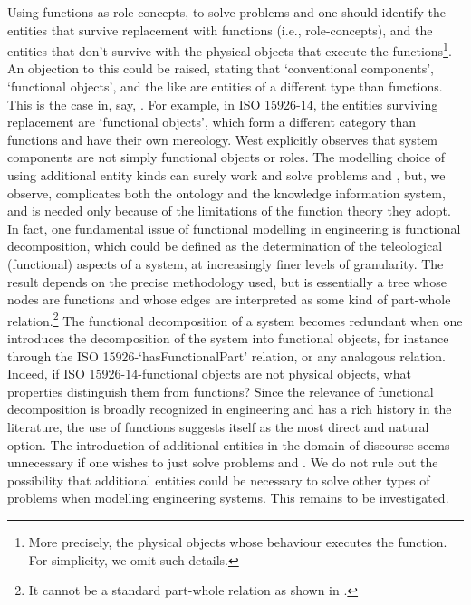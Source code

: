 \documentclass[
]{ceurart}
\begin{document}
Using functions as role-concepts, to solve problems  and  one should identify the entities that survive replacement with functions (i.e., role-concepts), and the entities that don't survive with the physical objects that execute the functions\footnote{More precisely, the physical objects whose behaviour executes the function. For simplicity, we omit such details.}. 
An objection to this could be raised, stating that `conventional components', `functional objects', and the like are entities of a different type than functions. This is the case in, say, \cite{westDevelopingHighQuality2011,guarinoArtefactualSystemsMissing2014,kluwerISO159261420202020}. For example, in ISO 15926-14, the entities surviving replacement are `functional objects', which form a different category than functions and have their own mereology. West \cite{westDevelopingHighQuality2011} explicitly observes that system components are not simply functional objects or roles. 
The modelling choice of using additional entity kinds can surely work and solve problems  and , but, we observe, complicates both the ontology and the knowledge information system, and is needed only because of the limitations of the function theory they adopt. 
In fact, one fundamental issue of functional modelling in engineering is functional decomposition, which could be defined as the determination of the teleological (functional) aspects of a system, at increasingly finer levels of granularity. The result depends on the precise methodology used, but is essentially a tree whose nodes are functions and whose edges are interpreted as some kind of part-whole relation.\footnote{It cannot be a standard part-whole relation as shown in \cite{vermaasFormalImpossibilityAnalysing2013}.}
The functional decomposition of a system becomes redundant when one introduces the decomposition of the system into functional objects, for instance through the ISO 15926-`hasFunctionalPart' relation, or any analogous relation. Indeed, if ISO 15926-14-functional objects are not physical objects, what properties distinguish them from functions?
Since the relevance of functional decomposition is broadly recognized in engineering and has a rich history in the literature, the use of functions suggests itself as the most direct and natural option.
The introduction of additional entities in the domain of discourse
seems unnecessary if one wishes to just solve problems  and . We do not rule out the possibility that additional entities could be necessary to solve other types of problems when modelling engineering systems. This remains to be investigated.
\end{document}
